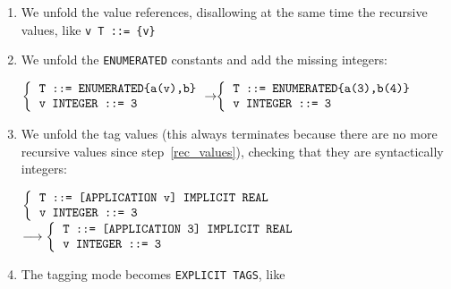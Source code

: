 \begin{enumerate}
   assuming the excerpt {\small \verb+  x INTEGER ::= 7  y INTEGER ::= 0+}

   Also, values in hexadecimal form are translated into binary form:
   \begin{center}
     {\small \verb+x U ::= 'A'H+ $\longrightarrow$
        \verb+x U ::= '1010'B+}
   \end{center}

  \item \label{rec_values} We unfold the value references, disallowing
  at the same time the recursive values, like {\small
  \verb+v T ::= {v}+}

  \item We unfold the {\small \verb+ENUMERATED+} constants and add the
  missing integers:

  \begin{center}
  {\small
   $\left\{
    \begin{tabular}{l}
      \verb+T ::= ENUMERATED{a(v),b}+\\
      \verb+v INTEGER ::= 3+
    \end{tabular}
    \right.
    \!\!\rightarrow\!\!
    \left\{
    \begin{tabular}{l}
      \verb+T ::= ENUMERATED{a(3),b(4)}+\\
      \verb+v INTEGER ::= 3+
    \end{tabular}
    \right.$    
  }  
  \end{center}

  \item We unfold the tag values (this always terminates because there
  are no more recursive values since step~\ref{rec_values}), checking
  that they are syntactically integers:

  \begin{center}
  {\small 
   $\left\{
    \begin{tabular}{l}
      \verb+T ::= [APPLICATION v] IMPLICIT REAL+\\
      \verb+v INTEGER ::= 3+
    \end{tabular}
    \right.$
    $\longrightarrow
    \left\{
    \begin{tabular}{l}
      \verb+T ::= [APPLICATION 3] IMPLICIT REAL+\\
      \verb+v INTEGER ::= 3+
    \end{tabular}
    \right.$
  }
  \end{center} 


  \item The tagging mode becomes \texttt{EXPLICIT TAGS}, like


\end{enumerate}
